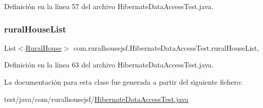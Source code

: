 Definición en la línea 57 del archivo Hibernate\+Data\+Access\+Test.\+java.

\mbox{\label{a00272_a989d035f20b8a64527db2fbbd411943e}} 
\subsubsection{\texorpdfstring{ruralHouseList}{ruralHouseList}}
{\footnotesize\ttfamily List$<$\mbox{\hyperlink{a00188}{Rural\+House}}$>$ com.\+ruralhousejsf.\+Hibernate\+Data\+Access\+Test.\+rural\+House\+List\hspace{0.3cm}{\ttfamily [static]}, {\ttfamily [package]}}



Definición en la línea 63 del archivo Hibernate\+Data\+Access\+Test.\+java.



La documentación para esta clase fue generada a partir del siguiente fichero\+:\begin{DoxyCompactItemize}
\item 
test/java/com/ruralhousejsf/\mbox{\hyperlink{a00101}{Hibernate\+Data\+Access\+Test.\+java}}\end{DoxyCompactItemize}
